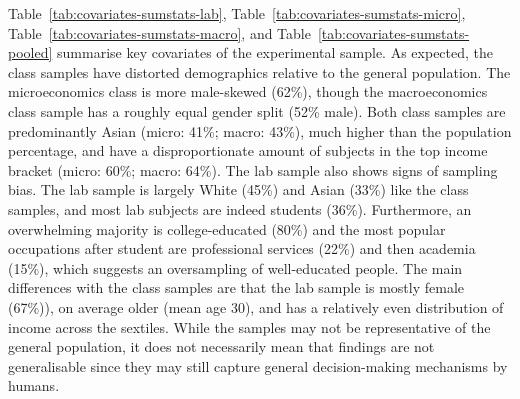 \documentclass[12pt, letterpaper]{article}
\begin{document}
Table~\ref{tab:covariates-sumstats-lab}, Table~\ref{tab:covariates-sumstats-micro}, Table~\ref{tab:covariates-sumstats-macro}, and Table~\ref{tab:covariates-sumstats-pooled} summarise key covariates of the experimental sample. As expected, the class samples have distorted demographics relative to the general population. The microeconomics class is more male-skewed (62\%), though the macroeconomics class sample has a roughly equal gender split (52\% male). Both class samples are predominantly Asian (micro: 41\%; macro: 43\%), much higher than the population percentage, and have a disproportionate amount of subjects in the top income bracket (micro: 60\%; macro: 64\%). The lab sample also shows signs of sampling bias. The lab sample is largely White (45\%) and Asian (33\%) like the class samples, and most lab subjects are indeed students (36\%). Furthermore, an overwhelming majority is college-educated (80\%) and the most popular occupations after student are professional services (22\%) and then academia (15\%), which suggests an oversampling of well-educated people. The main differences with the class samples are that the lab sample is mostly female (67\%)), on average older (mean age 30), and has a relatively even distribution of income across the sextiles. While the samples may not be representative of the general population, it does not necessarily mean that findings are not generalisable since they may still capture general decision-making mechanisms by humans.
\end{document}
